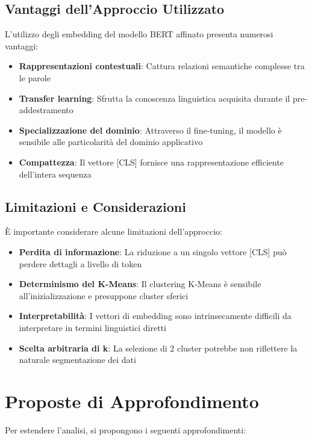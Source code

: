 \documentclass{article}
\begin{document}
\subsection{Vantaggi dell'Approccio Utilizzato}

L'utilizzo degli embedding del modello BERT affinato presenta numerosi vantaggi:

\begin{itemize}
    \item \textbf{Rappresentazioni contestuali}: Cattura relazioni semantiche complesse tra le parole
    \item \textbf{Transfer learning}: Sfrutta la conoscenza linguistica acquisita durante il pre-addestramento
    \item \textbf{Specializzazione del dominio}: Attraverso il fine-tuning, il modello è sensibile alle particolarità del dominio applicativo
    \item \textbf{Compattezza}: Il vettore [CLS] fornisce una rappresentazione efficiente dell'intera sequenza
\end{itemize}

\subsection{Limitazioni e Considerazioni}

È importante considerare alcune limitazioni dell'approccio:

\begin{itemize}
    \item \textbf{Perdita di informazione}: La riduzione a un singolo vettore [CLS] può perdere dettagli a livello di token
    \item \textbf{Determinismo del K-Means}: Il clustering K-Means è sensibile all'inizializzazione e presuppone cluster sferici
    \item \textbf{Interpretabilità}: I vettori di embedding sono intrinsecamente difficili da interpretare in termini linguistici diretti
    \item \textbf{Scelta arbitraria di k}: La selezione di 2 cluster potrebbe non riflettere la naturale segmentazione dei dati
\end{itemize}

\section{Proposte di Approfondimento}

Per estendere l'analisi, si propongono i seguenti approfondimenti:
\end{document}
